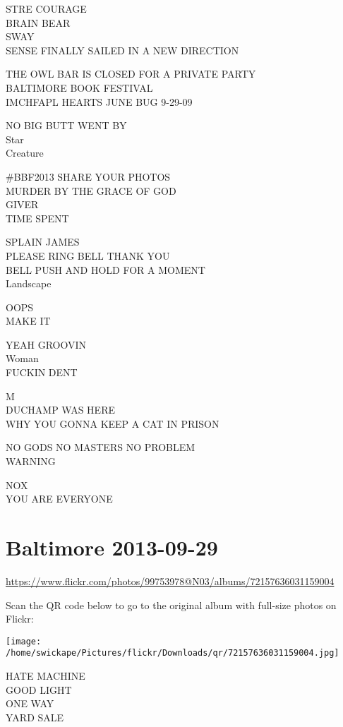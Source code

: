 \documentclass[10pt,letterpaper]{article}
\begin{document}
STRE COURAGE\\
BRAIN BEAR\\
SWAY\\
SENSE FINALLY SAILED IN A NEW DIRECTION

THE OWL BAR IS CLOSED FOR A PRIVATE PARTY\\
BALTIMORE BOOK FESTIVAL\\
IMCHFAPL HEARTS JUNE BUG 9{-}29{-}09

NO BIG BUTT WENT BY\\
Star\\
Creature

\#BBF2013 SHARE YOUR PHOTOS\\
MURDER BY THE GRACE OF GOD\\
GIVER\\
TIME SPENT

SPLAIN JAMES\\
PLEASE RING BELL THANK YOU\\
BELL PUSH AND HOLD FOR A MOMENT\\
Landscape

OOPS\\
MAKE IT

YEAH GROOVIN\\
Woman\\
FUCKIN DENT

M\\
DUCHAMP WAS HERE\\
WHY YOU GONNA KEEP A CAT IN PRISON

NO GODS NO MASTERS NO PROBLEM\\
WARNING

NOX\\
YOU ARE EVERYONE
\pagebreak

\section*{Baltimore 2013-09-29}

\url{https://www.flickr.com/photos/99753978@N03/albums/72157636031159004}

Scan the QR code below to go to the original album with full-size photos on Flickr:

\texttt{[image: /home/swickape/Pictures/flickr/Downloads/qr/72157636031159004.jpg]}
\pagebreak

HATE MACHINE\\
GOOD LIGHT\\
ONE WAY\\
YARD SALE
\end{document}
